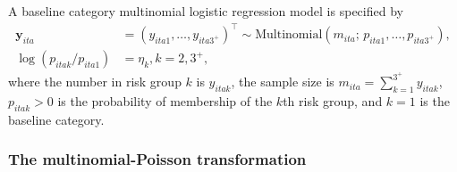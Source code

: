 \documentclass[a4paper, nobind]{templates/ociamthesis}
\newcommand{\y}{\mathbf{y}}
\begin{document}
A baseline category multinomial logistic regression model is specified by
\begin{align}
    \y_{ita} &= (y_{ita1}, \ldots, y_{ita3^{+}})^\top \sim \text{Multinomial}(m_{ita}; \, p_{ita1}, \ldots, p_{ita3^{+}}), \\
    \log(p_{itak} / p_{ita1}) &= \eta_k, k = 2, 3^{+},
\end{align}
where the number in risk group \(k\) is \(y_{itak}\), the sample size is \(m_{ita} = \sum_{k = 1}^{3^{+}} y_{itak}\), \(p_{itak} > 0\) is the probability of membership of the \(k\)th risk group, and \(k = 1\) is the baseline category.

\hypertarget{the-multinomial-poisson-transformation}{%
\subsubsection{The multinomial-Poisson transformation}\label{the-multinomial-poisson-transformation}}
\end{document}
